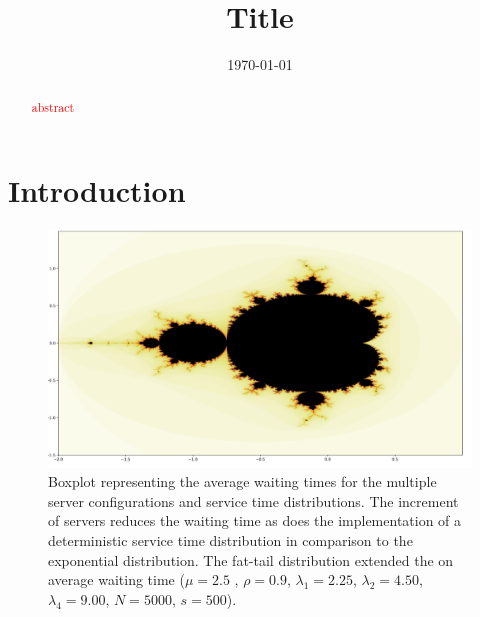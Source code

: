 \documentclass{uva-inf-article}
\title{Title}
\date{\today}
\newcommand{\ad}[1]{\textcolor{red}{#1}}
\begin{document}
\maketitle



\begin{abstract}
 \ad{abstract}
\end{abstract}

\newpage

\section{Introduction}



\begin{figure}
    \centering
    \includegraphics[width=\linewidth]{figures/testfigure.png}
    \caption{Boxplot representing the average waiting times for the multiple server configurations and service time distributions. The increment of servers reduces the waiting time as does the implementation of a deterministic service time distribution in comparison to the exponential distribution. The fat-tail distribution extended the on average waiting time ($\mu=2.5$ , $\rho=0.9$, $\lambda_1 = 2.25$, $\lambda_2 = 4.50$, $\lambda_4 = 9.00$, $N=5000$, $s=500$).}
    \label{fig:boxplotDistributions}
\end{figure}
\end{document}
